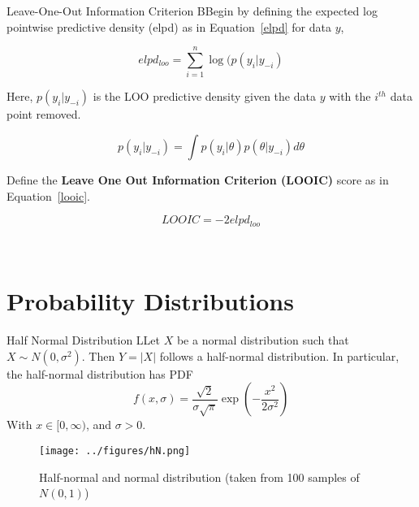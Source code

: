 \begin{definition}{Leave-One-Out Information Criterion}
BBegin by defining the expected log pointwise predictive density (elpd) as in Equation~\ref{elpd} for data $y$,

\begin{equation}
    elpd_{loo} = \sum_{i = 1}^n \log(p(y_i | y_{-i})
    \label{elpd}
\end{equation}

Here, $p(y_i|y_{-i})$ is the LOO predictive density given the data $y$ with the $i^{th}$ data point removed.

\begin{equation}
    p(y_i | y_{-i}) = \int p(y_i|\theta)p(\theta|y_{-i})d\theta
    \label{loopd}
\end{equation}

Define the \textbf{Leave One Out Information Criterion (LOOIC)} score as in Equation~\ref{looic}.

\begin{equation}
    LOOIC = -2elpd_{loo}
    \label{looic}
\end{equation}
\label{def:looic}
\end{definition}

\\

\section{Probability Distributions}

\begin{definition}{Half Normal Distribution}
    LLet $X$ be a normal distribution such that $X \sim N(0, \sigma^2)$. Then $Y = |X|$ follows a half-normal distribution. In particular, the half-normal distribution has PDF 
    \[
        f(x, \sigma) = \frac{\sqrt{2}}{\sigma \sqrt{\pi}}\exp \left(-\frac{x^2}{2\sigma^2}\right)    
    \]
    With $x \in [0, \infty)$, and $\sigma > 0$.
    \label{def:hndef}
\end{definition}

\begin{figure}[h]
    \centering
    \texttt{[image: ../figures/hN.png]}
    \caption{Half-normal and normal distribution (taken from 100 samples of $N(0,1)$)}
    \label{fig:hn}
\end{figure}
